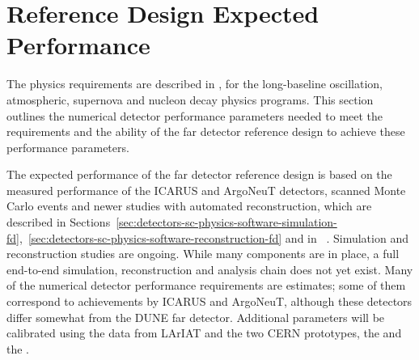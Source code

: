 
\section{Reference Design Expected Performance}
\label{sec:detectors-fd-ref-perf}

The physics requirements are described in \volphys,
for the long-baseline oscillation, atmospheric, supernova
and nucleon decay physics programs.  This section outlines the
numerical detector performance parameters needed to meet the
requirements and the ability of the far detector reference design
to achieve these performance parameters.  

The expected performance of the far detector reference design is based
on the measured performance of the ICARUS\cite{Amerio:2004ze} and
ArgoNeuT\cite{Anderson:2012vc} detectors, scanned Monte Carlo
events\cite{docdb-6954} and newer studies with automated
reconstruction, which are described in
Sections~\ref{sec:detectors-sc-physics-software-simulation-fd},~\ref{sec:detectors-sc-physics-software-reconstruction-fd}
and in \anxreco~\cite{cdr-annex-reco}.  Simulation and reconstruction studies are ongoing.
While many components are in place, a full end-to-end simulation,
reconstruction and analysis chain does not yet exist. Many of the
numerical detector performance requirements are estimates; some of
them correspond to achievements by ICARUS and ArgoNeuT, although these
detectors differ somewhat from the DUNE far detector.  Additional
parameters will be calibrated using the data from LArIAT and the two
CERN prototypes, the \cernsingleproto{} and the \cerndualproto.

